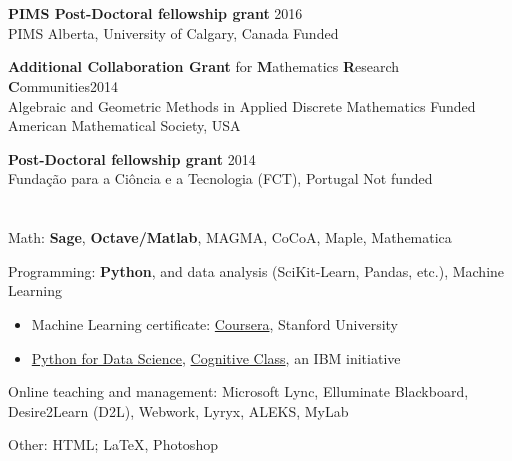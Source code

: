 \documentclass[margin,line,pifont,palatino,courier]{res}
\begin{document}
\begin{resume}
\begin{description}
\end{description}
 
 
 
\section{} 
\begin{description}
	\item \textbf{PIMS Post-Doctoral fellowship grant} \hfill 2016 \\
{\small PIMS Alberta, University of Calgary, Canada} \hfill Funded
	\item \textbf{Additional Collaboration Grant} for \textbf{M}athematics \textbf{R}esearch \textbf{C}ommunities\hfill 2014 \\ Algebraic and Geometric Methods in Applied Discrete Mathematics \hfill Funded \\
{\small American Mathematical Society, USA} 
	\item \textbf{Post-Doctoral fellowship grant} \hfill 2014 \\
{\small Funda\c{c}\~{a}o para a Ci\^{o}ncia e a Tecnologia (FCT), Portugal} \hfill Not funded
\end{description}


 
 
 
 
\section{}
\begin{description}
\item Math: \textbf{Sage}, \textbf{Octave/Matlab}, MAGMA, CoCoA, Maple, Mathematica
\item Programming: \textbf{Python}, and data analysis (SciKit-Learn, Pandas, etc.), Machine Learning
	\begin{itemize}
		\item Machine Learning certificate: \href{https://www.coursera.org/learn/machine-learning}{Coursera}, Stanford University
		\item \href{https://courses.cognitiveclass.ai/certificates/e97138f56af040f3b097ff439dd2c730}{Python for Data Science}, \href{https://cognitiveclass.ai/courses/python-for-data-science/}{Cognitive Class}, an IBM initiative
	\end{itemize}
\item Online teaching and management: Microsoft Lync, Elluminate Blackboard, \\Desire2Learn (D2L), Webwork, Lyryx, ALEKS, MyLab
\item Other: HTML; \LaTeX , Photoshop
\end{description}


\end{resume}
\end{document}
